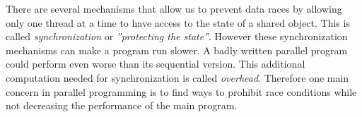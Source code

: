 \documentclass{scrreprt}
\begin{document}
There are several mechanisms that allow us to prevent data races by allowing only one thread at a time to have access to the state of a shared object. This is called \textit{synchronization} or \textit{''protecting the state''}. However these synchronization mechanisms can make a program run slower. A badly written parallel program could perform even worse than its sequential version. This additional computation needed for synchronization is called \textit{overhead}.
Therefore one main concern in parallel programming is to find ways to prohibit race conditions while not decreasing the performance of the main program. \\

\begin{comment}

\subsection{Task Parallelism}
Task parallelism is a programming model in which the programmer defines tasks (some code) and when their are executed. Tasks can `spawn'other tasks or wait until they have finished. The waiting operation is often call `join'.\\
The definition of when tasks are spawned is called the task graph. It consists of the tasks reperesented by vertices that are connected by arrows implying that a task is bein spawned by another task or if several arrows point towards the same task, that this task is waiting for the other tasks to finish.  \\
Good examples for task parallelism are recursive algorithms. Consider as an example the following divide and conquer approach of solving the fibonacci sequence:
\begin{algorithmic}
\STATE{function fibo (n: Integer): Integer}
\IF{$i=0$}
\STATE{return $0$}
\ELSIF{$i=1$}
\STATE{return $1$}
\ELSE
	\STATE{spawn new Task with $fibo(n-1)$}
	\STATE{spwawn new Task with $fibo(n-2)$}
	\STATE{join both tasks save their results}
	\STATE{return the addion of the two results}
\ENDIF

\end{algorithmic}

Tasks and Threads are not the same thing. If we were to create a treads in the above example while trying to calculate the 100th fibonacci number the program would create at least 2 to the power of 98 threads. Thread objects have some overhead, meaning too many threads will decrease the overall performance of the program. On they other hand it is very unlikely that our system has that many processors. Most modern multicore processors have between 2 and 8 cores. \\
Tasks are amounts of work that can be scheduled onto threads and then be execeuted. \\


\end{comment}
\end{document}
